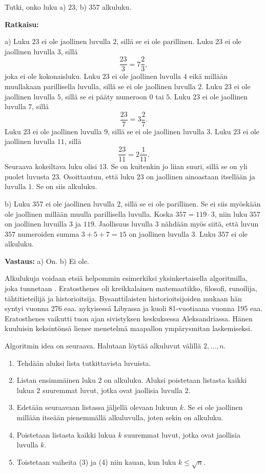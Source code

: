 \begin{esimerkki}
Tutki, onko luku a) $23$, b) $357$ alkuluku.

{\bf Ratkaisu:}

a) Luku $23$ ei ole jaollinen luvulla $2$, sillä se ei ole
parillinen. Luku $23$ ei ole jaollinen luvulla $3$, sillä
\[
\frac{23}{3}= 7\frac{2}{3},
\]
joka ei ole kokonaisluku. Luku $23$ ei ole jaollinen luvulla $4$
eikä millään muullakaan parillisella luvulla, sillä se ei ole
jaollinen luvulla $2$. Luku $23$ ei ole
jaollinen luvulla $5$, sillä se ei pääty numeroon $0$ tai $5$.
Luku $23$ ei ole jaollinen luvulla $7$, sillä
\[
\frac{23}{7} = 3\frac{2}{7}.
\]
Luku $23$ ei ole jaollinen luvulla $9$, sillä se ei ole jaollinen
luvulla $3$. Luku $23$ ei ole jaollinen luvulla $11$, sillä
\[
\frac{23}{11} = 2\frac{1}{11}.
\]
Seuraava kokeiltava luku olisi $13$. Se on kuitenkin jo liian
suuri, sillä se on yli puolet luvusta $23$. Osoittautuu, että
luku $23$ on jaollinen ainoastaan itsellään ja luvulla $1$. Se on
siis alkuluku.

b) Luku $357$ ei ole jaollinen luvulla $2$, sillä se ei ole
parillinen. Se ei siis myöskään ole jaollinen millään muulla
parillisella luvulla. Koska $357 = 119 \cdot 3$, niin luku $357$
on jaollinen luvuilla $3$ ja $119$. Jaollisuus luvulla $3$
nähdään myös siitä, että luvun $357$ numeroiden summa $3 + 5 + 7
= 15$ on jaollinen luvulla $3$. Luku $357$ ei ole alkuluku.

{\bf Vastaus:} a) On. b) Ei ole.
\end{esimerkki}

Alkulukuja voidaan etsiä helpommin esimerkiksi yksinkertaisella algoritmilla, joka tunnetaan . Eratosthenes oli kreikkalainen matemaatikko, filosofi, runoilija, tähtitieteilijä ja historioitsija. Bysanttilaisten historioitsijoiden mukaan hän syntyi vuonna 276 eaa. nykyisessä Libyassa ja kuoli 81-vuotiaana vuonna 195 eaa. Eratosthenes vaikutti tuon ajan sivistyksen keskuksessa Aleksandriassa. Hänen kuuluisin keksintönsä lienee menetelmä maapallon ympärysmitan laskemiseksi. %

Algoritmin idea on seuraava. Halutaan löytää alkuluvut välillä $2,\ldots,n$.
\begin{enumerate}
\item Tehdään aluksi lista tutkittavista luvuista. 
\item Listan ensimmäinen luku $2$ on alkuluku. Aluksi poistetaan listasta kaikki lukua $2$ suuremmat luvut, jotka ovat jaollisia luvulla $2$.
\item Edetään seuraavaan listassa jäljellä olevaan lukuun $k$. Se ei ole jaollinen millään itseään pienemmällä alkuluvulla, joten sekin on alkuluku.
\item Poistetaan listasta kaikki lukua $k$ suuremmat luvut, jotka ovat jaollisia luvulla $k$.
\item Toistetaan vaiheita (3) ja (4) niin kauan, kun luku $k \le \sqrt{n}$. 
\end{enumerate}

